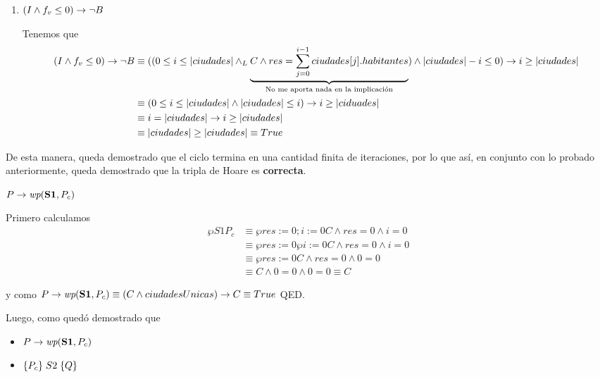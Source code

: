 \documentclass[10pt,a4paper]{article}
\begin{document}
\begin{enumerate}
	\item $(I \land f_v \leq 0) \rightarrow \neg B$

	      Tenemos que
	      \begin{align*}
		      (I \land f_v \leq 0) \rightarrow \neg B & \equiv ((0 \leq i \leq |ciudades| \land _L \underbrace{C \land res = \sum_{j = 0}^{i - 1} ciudades[j].habitantes}_{\text{No me aporta nada en la implicación}}) \land |ciudades| - i \leq 0) \rightarrow i \geq |ciudades| \\
		                                        & \equiv (0 \leq i \leq |ciudades| \land |ciudades| \leq i) \rightarrow i \geq |ciduades|                                                                                                                                   \\
		                                        & \equiv i = |ciudades| \rightarrow i \geq |ciudades|                                                                                                                                                                       \\
		                                        & \equiv |ciudades| \geq |ciudades| \equiv True
	      \end{align*}
\end{enumerate}

De esta manera, queda demostrado que el ciclo termina en una cantidad finita de iteraciones, por lo que así, en conjunto con lo probado anteriormente, queda demostrado que la tripla de Hoare  es \textbf{correcta}.
\bigskip

{\large$P \Then \wp{S1}{P_c}$}
\medskip

Primero calculamos 
%
\begin{align*}
	\wp{S1}{P_c} & \equiv \wp{res := 0; i := 0}{C \land res = 0 \land i = 0}      \\
	             & \equiv \wp{res := 0}{\wp{i := 0}{C \land res = 0 \land i = 0}} \\
	             & \equiv \wp{res := 0}{C \land res = 0 \land 0 = 0}              \\
	             & \equiv C \land 0 = 0 \land 0 = 0 \equiv C
\end{align*}

y como $P \Then \wp{S1}{P_c} \equiv (C \land ciudadesUnicas) \Then C \equiv True$ QED.
\bigskip

Luego, como quedó demostrado que

\begin{itemize}
	\item $P \Then \wp{S1}{P_c}$
	\item $\{P_c\} \; S2 \; \{Q\}$
\end{itemize}
\end{document}
